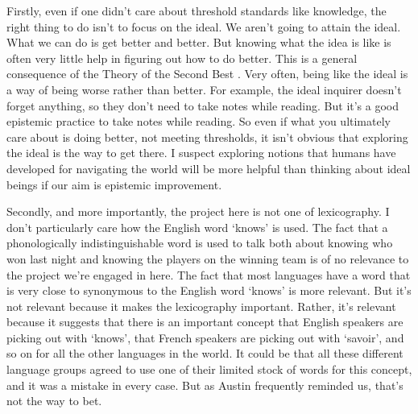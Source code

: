 \documentclass[
  11pt,
]{book}
\begin{document}
Firstly, even if one didn't care about threshold standards like knowledge, the right thing to do isn't to focus on the ideal. We aren't going to attain the ideal. What we can do is get better and better. But knowing what the idea is like is often very little help in figuring out how to do better. This is a general consequence of the Theory of the Second Best \citep{LipseyLancaster}. Very often, being like the ideal is a way of being worse rather than better. For example, the ideal inquirer doesn't forget anything, so they don't need to take notes while reading. But it's a good epistemic practice to take notes while reading. So even if what you ultimately care about is doing better, not meeting thresholds, it isn't obvious that exploring the ideal is the way to get there. I suspect exploring notions that humans have developed for navigating the world will be more helpful than thinking about ideal beings if our aim is epistemic improvement.

Secondly, and more importantly, the project here is not one of lexicography. I don't particularly care how the English word `knows' is used. The fact that a phonologically indistinguishable word is used to talk both about knowing who won last night and knowing the players on the winning team is of no relevance to the project we're engaged in here. The fact that most languages have a word that is very close to synonymous to the English word `knows' is more relevant. But it's not relevant because it makes the lexicography important. Rather, it's relevant because it suggests that there is an important concept that English speakers are picking out with `knows', that French speakers are picking out with `savoir', and so on for all the other languages in the world. It could be that all these different language groups agreed to use one of their limited stock of words for this concept, and it was a mistake in every case. But as Austin frequently reminded us, that's not the way to bet.
\end{document}
